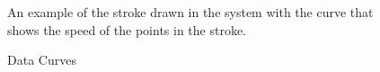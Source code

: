 \documentclass{article}%
\begin{document}
%	
%		
%
\begin{figure}[]
	\centering
	\caption{Data Curves} An example of the stroke drawn in the system with the curve that shows the speed of the points in the stroke.%
\end{figure}
\end{document}
